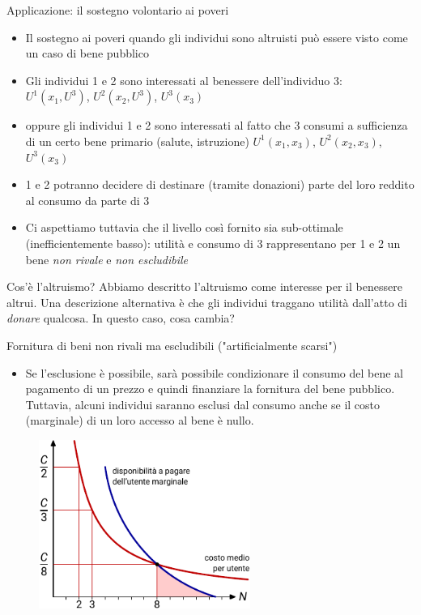 \documentclass[aspectratio=149,11pt]{beamer}
\begin{document}
\begin{frame}{Applicazione: il sostegno volontario ai poveri}
\begin{itemize}
\item Il sostegno ai poveri quando gli individui sono altruisti può essere visto
come un caso di bene pubblico
\item Gli individui 1 e 2 sono interessati al benessere dell'individuo 3:\\[0pt]
$U^1(x_1,U^3)$, $U^2(x_2,U^3)$, $U^3(x_3)$
\item oppure gli individui 1 e 2 sono interessati al fatto che 3 consumi a
sufficienza di un certo bene primario (salute, istruzione)
$U^1(x_1,x_3)$, $U^2(x_2,x_3)$, $U^3(x_3)$
\item 1 e 2 potranno decidere di destinare (tramite donazioni) parte del loro
reddito al consumo da parte di 3
\item Ci aspettiamo tuttavia che il livello così fornito sia sub-ottimale
(inefficientemente basso): utilità e consumo di 3 rappresentano per 1 e 2 un
bene \emph{non rivale} e \emph{non escludibile}
\end{itemize}

\begin{block}{Cos'è l'altruismo?}
Abbiamo descritto l'altruismo come interesse per il benessere altrui.  Una
descrizione alternativa è che gli individui traggano utilità dall'atto di
\emph{donare} qualcosa.  In questo caso, cosa cambia?
\end{block}
\end{frame}

\begin{frame}{Fornitura di beni non rivali ma escludibili ("artificialmente scarsi")}
\begin{itemize}
\item Se l'esclusione è possibile, sarà possibile condizionare il consumo del bene
al pagamento di un prezzo e quindi finanziare la fornitura del bene
pubblico.  Tuttavia, alcuni individui saranno esclusi dal consumo anche se
il costo (marginale) di un loro accesso al bene è nullo.
\end{itemize}
\begin{figure}[htbp]
\centering
\includegraphics[height=5.5cm]{./figure/beni-pubblici-escludibili-1-color.pdf}
\end{figure}
\end{frame}
\end{document}
